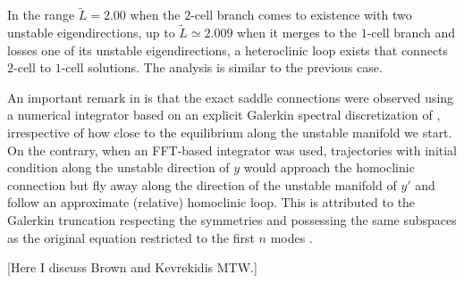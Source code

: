 In the range $\tilde{L}=2.00$ when the $2$-cell branch comes to
existence with two unstable eigendirections, up to $\tilde{L}
\simeq 2.009$ when it merges to the $1$-cell branch and losses
one of its unstable eigendirections, a heteroclinic loop exists
that connects $2$-cell to $1$-cell solutions. The analysis is
similar to the previous case.

An important remark in  is that the exact
saddle connections were observed using a numerical integrator
based on an explicit Galerkin spectral discretization of \KSe,
irrespective of how close to the equilibrium along the unstable
manifold we start. On the contrary, when an FFT-based
integrator was used, trajectories with initial condition along
the unstable direction of $y$ would approach the homoclinic
connection but fly away along the direction of the unstable
manifold of $y'$ and follow an approximate (relative)
homoclinic loop. This is attributed to the Galerkin truncation
respecting the symmetries and possessing the same subspaces as
the original equation restricted to the first $n$ modes .

[Here I discuss Brown and Kevrekidis MTW.]
